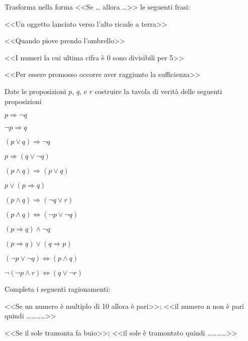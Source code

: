 \begin{esercizio}
\label{ese:0.15}
Trasforma nella forma <<Se \ldots{} allora \ldots{}>> le seguenti frasi:
\begin{enumeratea}
\item <<Un oggetto lanciato verso l'alto ricade a terra>>
\item <<Quando piove prendo l'ombrello>>
\item <<I numeri la cui ultima cifra è 0 sono divisibili per 5>>
\item <<Per essere promosso occorre aver raggiunto la sufficienza>>
\end{enumeratea}
\end{esercizio}

\begin{esercizio}
\label{ese:0.16}
Date le proposizioni $p$, $q$, e $r$ costruire la tavola di verità delle seguenti proposizioni
\begin{multicols}{3}
\begin{enumeratea}
\item $p\Rightarrow\neg q$
\item $\neg p\Rightarrow q$
\item $(p\vee q)\Rightarrow \neg q$
\item $p\Rightarrow (q\vee \neg q)$
\item $(p\wedge q)\Rightarrow(p\vee q)$
\item $p\vee(p\Rightarrow q)$
\item $(p\wedge q)\Rightarrow(\neg q\vee r)$
\item $(p\wedge q)\Leftrightarrow(\neg p\vee \neg q)$
\item $(p\Rightarrow q)\wedge \neg q$
\item $(p\Rightarrow q)\vee(q\Rightarrow p)$
\item $(\neg p\vee\neg q)\Leftrightarrow(p\wedge q)$
\item $\neg(\neg p\wedge r)\Leftrightarrow(q\vee\neg r)$
\end{enumeratea}
\end{multicols}
\end{esercizio}

\begin{esercizio}
\label{ese:0.17}
Completa i seguenti ragionamenti:
\begin{enumeratea}
\item <<Se un numero è multiplo di 10 allora è pari>>; <<il numero n non è pari quindi \ldots\ldots\ldots\ldots>>
\item <<Se il sole tramonta fa buio>>; <<il sole è tramontato quindi \ldots\ldots\ldots\ldots>>
\end{enumeratea}
\end{esercizio}

